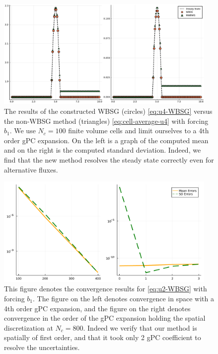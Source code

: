 \documentclass[12pt]{article}
\begin{document}
\begin{figure}[!htb]
    \centering
    \includegraphics[width=0.95\textwidth]{Figures/u4}
    \caption{The results of the constructed WBSG (circles) \eqref{eq:u4-WBSG} versus the non-WBSG method (triangles) \eqref{eq:cell-average-u4} with forcing $b_1$. We use $N_c = 100$ finite volume cells and limit ourselves to a 4th order gPC expansion. On the left is a graph of the computed mean and on the right is the computed standard deviation. Indeed, we find that the new method resolves the steady state correctly even for alternative fluxes.}
    \label{fig:u4}
\end{figure}
\begin{figure}[!htb]
    \centering
    \includegraphics[width=0.95\textwidth]{Figures/convergence}
    \caption{This figure denotes the convergence results for \eqref{eq:u2-WBSG} with forcing $b_1$. The figure on the left denotes convergence in space with a 4th order gPC expansion, and the figure on the right denotes convergence in the order of the gPC expansion holding the spatial discretization at $N_c = 800$. Indeed we verify that our method is spatially of first order, and that it took only 2 gPC coefficient to resolve the uncertainties.}
    \label{fig:convergence}
\end{figure}
\end{document}
